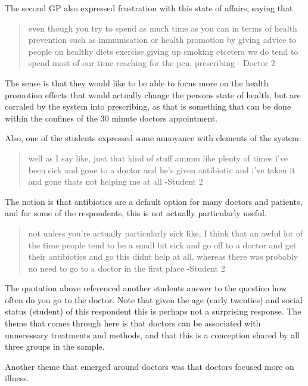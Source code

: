 The second GP also expressed frustration with this state of affairs, saying that 
\begin{quotation}
  even though you try to spend as much time as you can in terms of health prevention such as immunisation or health promotion by giving advice to people on healthy diets exercise giving up smoking etcetera we do tend to spend most of our time reaching for the pen, prescribing - Doctor 2

\end{quotation}

The sense is that they would like to be able to focus more on the health promotion effects that would actually change the persons state of health, but are corraled by the system into prescribing, as that is something that can be done within the confines of the 30 minute doctors appointment. 

Also, one of the students expressed some annoyance with elements of the system: 
\begin{quotation}
  well as I say like, just that kind of stuff ammm like plenty of times i've been sick and gone to a doctor and he's given antibiotic and i've taken it and gone thats not helping me at all -Student 2

\end{quotation}

The notion is that antibiotics are a default option for many doctors and patients, and for some of the respondents, this is not actually particularly useful. 

\begin{quotation}
not unless you're actually particularly sick like, I think that an awful lot of the time people tend to be a small bit sick and go off to a doctor and get their antibiotics and go this didnt help at all, whereas there was probably no need to go to a doctor in the first place -Student 2

\end{quotation}

The quotation above referenced another students answer to the question how often do you go to the doctor. Note that given the age (early twenties) and social status (student) of this respondent this is perhaps not a surprising response.  The theme that comes through here is that doctors can be associated with unnecessary treatments and methods, and that this is a conception shared by all three groups in the sample. 


Another theme that emerged around doctors was that doctors focused more on illness. 

